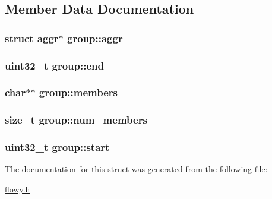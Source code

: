 \subsection{\-Member \-Data \-Documentation}
\hypertarget{structgroup_abf1076c6debaaa605fdcfc46ca0ee97d}{
\subsubsection[{aggr}]{\setlength{\rightskip}{0pt plus 5cm}struct {\bf aggr}$\ast$ {\bf group\-::aggr}}}\label{structgroup_abf1076c6debaaa605fdcfc46ca0ee97d}
\hypertarget{structgroup_a23a336dd7e472307769dfcc2c1bb8503}{
\subsubsection[{end}]{\setlength{\rightskip}{0pt plus 5cm}uint32\-\_\-t {\bf group\-::end}}}\label{structgroup_a23a336dd7e472307769dfcc2c1bb8503}
\hypertarget{structgroup_a4bb58cf13aa5a2f653c18385ba11b008}{
\subsubsection[{members}]{\setlength{\rightskip}{0pt plus 5cm}char$\ast$$\ast$ {\bf group\-::members}}}\label{structgroup_a4bb58cf13aa5a2f653c18385ba11b008}
\hypertarget{structgroup_a3606a1f9876a73c5541e4e19f2b3cbba}{
\subsubsection[{num\-\_\-members}]{\setlength{\rightskip}{0pt plus 5cm}size\-\_\-t {\bf group\-::num\-\_\-members}}}\label{structgroup_a3606a1f9876a73c5541e4e19f2b3cbba}
\hypertarget{structgroup_afd06fbd1169740e0a0994f9395467d77}{
\subsubsection[{start}]{\setlength{\rightskip}{0pt plus 5cm}uint32\-\_\-t {\bf group\-::start}}}\label{structgroup_afd06fbd1169740e0a0994f9395467d77}


\-The documentation for this struct was generated from the following file\-:\begin{DoxyCompactItemize}
\item 
\hyperlink{flowy_8h}{flowy.\-h}\end{DoxyCompactItemize}
